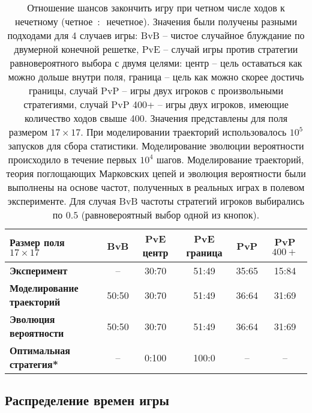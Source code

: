 \begin{table}[]
    \fontsize{10pt}{10pt}\selectfont
    \begin{tabular}{|l|c|c|c|c|c|}
        \toprule
        Размер поля $17 \times 17$ & \textbf{BvB} & \textbf{PvE центр} & \textbf{PvE граница} & \textbf{PvP} & \textbf{PvP $400+$} \\
        \midrule
        \textbf{Эксперимент} & --     & 30:70 & 51:49 & 35:65 & 15:84 \\
        \textbf{Моделирование траекторий} & 50:50 & 30:70 & 51:49 & 36:64 & 31:69 \\
        \textbf{Эволюция вероятности}  & 50:50 & 30:70 & 51:49 & 36:64 & 31:69 \\
        \textbf{Оптимальная стратегия*}    & --     & 0:100 & 100:0 & --   & --     \\
        \bottomrule
    \end{tabular}
    \caption{
        Отношение шансов закончить игру при четном числе ходов к нечетному (четное~$:$~нечетное). Значения были получены разными подходами для 4 случаев игры: BvB -- чистое случайное блуждание по двумерной конечной решетке, PvE -- случай игры против стратегии равновероятного выбора с двумя целями: центр -- цель оставаться как можно дольше внутри поля, граница -- цель как можно скорее достичь границы, случай PvP -- игры двух игроков с произвольными стратегиями, случай PvP 400+ -- игры двух игроков, имеющие количество ходов свыше 400. Значения представлены для поля размером $17 \times 17$. При моделировании траекторий использовалось $10^5$ запусков для сбора статистики. Моделирование эволюции вероятности происходило в течение первых $10^4$ шагов. Моделирование траекторий, теория поглощающих Марковских цепей и эволюция вероятности были выполнены на основе частот, полученных в реальных играх в полевом эксперименте. Для случая BvB частоты стратегий игроков выбирались по $0.5$ (равновероятный выбор одной из кнопок).
    }
    \label{tab:parity}
\end{table}

\subsection{Распределение времен игры}\label{subsec:ch3/sec4/sub3}

